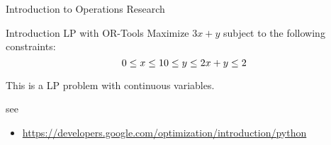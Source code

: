 \documentclass[
  ignorenonframetext,
]{beamer}
\providecommand{\tightlist}{%
  \setlength{\itemsep}{0pt}\setlength{\parskip}{0pt}}\usepackage{longtable,booktabs,array}
\begin{document}
\begin{frame}{Introduction to Operations Research}
\begin{block}{Introduction LP with OR-Tools}
\protect\hypertarget{introduction-lp-with-or-tools}{}
Maximize \(3x + y\) subject to the following constraints: \[
0 \leq x \leq 1 \\
0 \leq y \leq 2 \\
x + y \leq 2
\]

This is a LP problem with continuous variables.

see

\begin{itemize}
\tightlist
\item
  \url{https://developers.google.com/optimization/introduction/python}
\end{itemize}
\end{block}
\end{frame}
\end{document}
